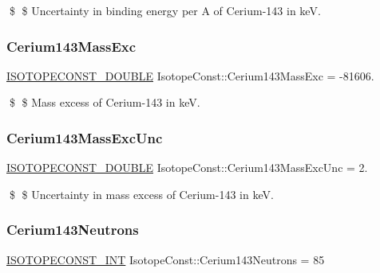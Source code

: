 \$ \$ Uncertainty in binding energy per A of Cerium-\/143 in keV. \mbox{\label{group___isotope_const-_cerium-_ce143_ga6773dbd51c2cf618a28c3551aae50d9d}} 
\subsubsection{\texorpdfstring{Cerium143\+Mass\+Exc}{Cerium143MassExc}}
{\footnotesize\ttfamily \mbox{\hyperlink{group___isotope_const-_macros_ga8f45a7272ce02c0b4c65c44636ed719a}{I\+S\+O\+T\+O\+P\+E\+C\+O\+N\+S\+T\+\_\+\+D\+O\+U\+B\+LE}} Isotope\+Const\+::\+Cerium143\+Mass\+Exc = -\/81606.}

\$ \$ Mass excess of Cerium-\/143 in keV. \mbox{\label{group___isotope_const-_cerium-_ce143_ga633b2df39b5a4dc0f10be6dfec4c53c0}} 
\subsubsection{\texorpdfstring{Cerium143\+Mass\+Exc\+Unc}{Cerium143MassExcUnc}}
{\footnotesize\ttfamily \mbox{\hyperlink{group___isotope_const-_macros_ga8f45a7272ce02c0b4c65c44636ed719a}{I\+S\+O\+T\+O\+P\+E\+C\+O\+N\+S\+T\+\_\+\+D\+O\+U\+B\+LE}} Isotope\+Const\+::\+Cerium143\+Mass\+Exc\+Unc = 2.}

\$ \$ Uncertainty in mass excess of Cerium-\/143 in keV. \mbox{\label{group___isotope_const-_cerium-_ce143_ga6c4a6da99fd7571987602c77b9f8aff4}} 
\subsubsection{\texorpdfstring{Cerium143\+Neutrons}{Cerium143Neutrons}}
{\footnotesize\ttfamily \mbox{\hyperlink{group___isotope_const-_macros_ga5f18360b3e99483a35c32d789e62621c}{I\+S\+O\+T\+O\+P\+E\+C\+O\+N\+S\+T\+\_\+\+I\+NT}} Isotope\+Const\+::\+Cerium143\+Neutrons = 85}

